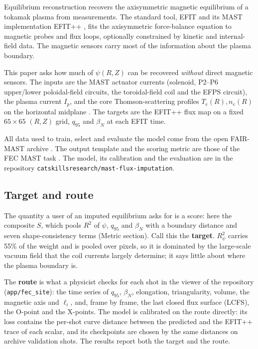 \documentclass[11pt,a4paper]{article}
\numberwithin{equation}{section}
\begin{document}
Equilibrium reconstruction recovers the axisymmetric magnetic equilibrium of a tokamak plasma from measurements. The standard tool, EFIT \cite{lao1985} and its MAST implementation EFIT++ \cite{appel2006}, fits the axisymmetric force-balance equation to magnetic probes and flux loops, optionally constrained by kinetic and internal-field data. The magnetic sensors carry most of the information about the plasma boundary.

This paper asks how much of \(\psi(R,Z)\) can be recovered \emph{without} direct magnetic sensors. The inputs are the MAST \cite{darke1995,sykes2001,lloyd2003} actuator currents (solenoid, P2--P6 upper/lower poloidal-field circuits, the toroidal-field coil and the EFPS circuit), the plasma current \(I_p\), and the core Thomson-scattering profiles \(T_e(R), n_e(R)\) on the horizontal midplane \cite{scannell2010}. The targets are the EFIT++ flux map on a fixed \(65\times65\) \((R,Z)\) grid, \(q_{95}\) and \(\beta_N\) at each EFIT time.

All data used to train, select and evaluate the model come from the open FAIR-MAST archive \cite{jackson2024fairmast}. The output template and the scoring metric are those of the FEC MAST task \cite{fec2026dataset,fec2026starter}. The model, its calibration and the evaluation are in the repository \nolinkurl{catskillsresearch/mast-flux-imputation}.

\hypertarget{target-and-route}{%
\subsection{Target and route}\label{target-and-route}}

The quantity a user of an imputed equilibrium asks for is a score: here the composite \(S\), which pools \(R^2\) of \(\psi\), \(q_{95}\) and \(\beta_N\) with a boundary distance and seven shape-consistency terms (Metric section). Call this the \textbf{target}. \(R^2_\psi\) carries 55\% of the weight and is pooled over pixels, so it is dominated by the large-scale vacuum field that the coil currents largely determine; it says little about where the plasma boundary is.

The \textbf{route} is what a physicist checks for each shot in the viewer of the repository (\nolinkurl{app/fec_site}): the time series of \(q_{95}\), \(\beta_N\), elongation, triangularity, volume, the magnetic axis and \(\ell_i\), and, frame by frame, the last closed flux surface (LCFS), the O-point and the X-points. The model is calibrated on the route directly: its loss contains the per-shot curve distance between the predicted and the EFIT++ trace of each scalar, and its checkpoints are chosen by the same distances on archive validation shots. The results report both the target and the route.
\end{document}
